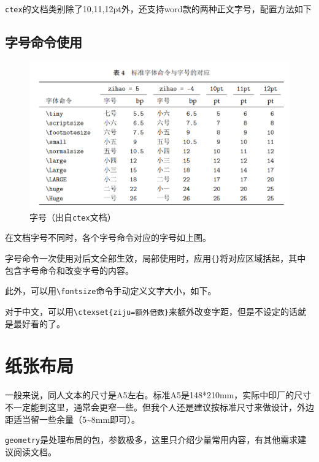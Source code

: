 \documentclass[10pt,openany]{book}
\begin{document}
\begin{sloppypar}
    \texttt{ctex}的文档类别除了10,11,12pt外，还支持word款的两种正文字号，配置方法如下

    

    \subsection{字号命令使用}

    \begin{figure}[H]
        \centering
        \includegraphics[width=\linewidth]{data/fontsize.png}
        \caption{字号（出自\texttt{ctex}文档）}
    \end{figure}

    在文档字号不同时，各个字号命令对应的字号如上图。

    字号命令一次使用对后文全部生效，局部使用时，应用\texttt{\{\}}将对应区域括起，其中包含字号命令和改变字号的内容。

    此外，可以用\texttt{\textbackslash{}fontsize}命令手动定义文字大小，如下。

    

    对于中文，可以用\texttt{\textbackslash{}ctexset\{ziju=额外倍数\}}来额外改变字距，但是不设定的话就是最好看的了。

    \section{纸张布局}

    一般来说，同人文本的尺寸是A5左右。标准A5是148*210mm，实际中印厂的尺寸不一定能到这里，通常会更窄一些。但我个人还是建议按标准尺寸来做设计，外边距适当留一些余量（5\textasciitilde8mm即可）。

    \texttt{geometry}是处理布局的包，参数极多，这里只介绍少量常用内容，有其他需求建议阅读文档。


\end{sloppypar}
\end{document}
